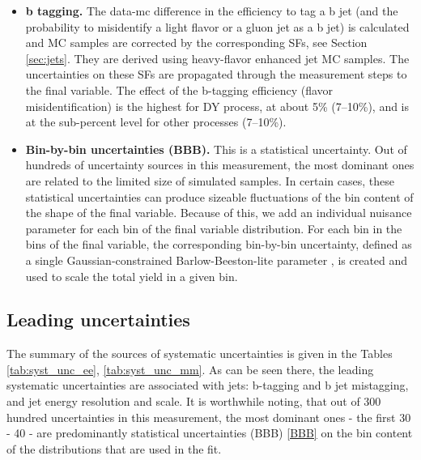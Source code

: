 \begin{itemize}
\item{\bf b tagging.}
The data-mc difference in the efficiency to tag a b jet (and the probability to misidentify a light flavor or a gluon jet as a b jet) is calculated and MC samples are corrected by the corresponding SFs, see Section \ref{sec:jets}. They are derived using heavy-flavor enhanced jet MC samples. The uncertainties on these SFs are propagated through the measurement steps to the final variable. The effect of the b-tagging efficiency (flavor misidentification) is the highest for DY process, at about 5\% (7--10\%), and is at the sub-percent level for other processes (7--10\%). 

\item{\bf Bin-by-bin uncertainties (BBB).} 
\label{BBB}
This is a statistical uncertainty. Out of hundreds of uncertainty sources in this measurement, the most dominant ones are related to the limited size of simulated samples. In certain cases, these statistical uncertainties can produce sizeable fluctuations of the bin content of the shape of the final variable. Because of this, we add an individual nuisance parameter for each bin of the final variable distribution. For each bin in the bins of the final variable, the corresponding bin-by-bin uncertainty, defined as a single Gaussian-constrained Barlow-Beeston-lite parameter \cite{Barlow-Beeston, autoMCStats}, is created and used to scale the total yield in a given bin.

\end{itemize}

\subsection{Leading uncertainties}
The summary of the sources of systematic uncertainties is given in the Tables \ref{tab:syst_unc_ee}, \ref{tab:syst_unc_mm}. As can be seen there, the leading systematic uncertainties are associated with jets: b-tagging and b jet mistagging, and jet energy resolution and scale. It is worthwhile noting, that out of 300 hundred uncertainties in this measurement, the most dominant ones - the first 30 - 40 - are predominantly statistical uncertainties (BBB) \ref{BBB} on the bin content of the \mTHH distributions  that are used in the fit.



